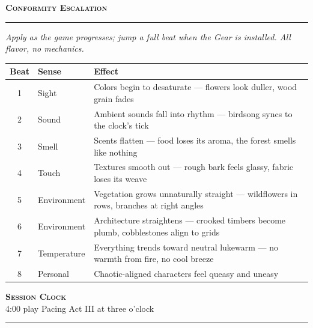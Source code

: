 \documentclass[10pt,letterpaper]{article}
\newcommand{\sceneheader}[4]{%
  \fancyhead[L]{\small\textcolor{accent}{\scshape #1}}%
  \fancyhead[R]{\small\textcolor{accent}{#2 \quad \textbullet \quad #3}}%
  \begin{center}
  {\LARGE\bfseries\scshape\textcolor{accent}{#1}}\\[2pt]
  {\small #2 \quad \textbullet \quad #3 \quad \textbullet \quad #4}\\[2pt]
  \textcolor{rulecol}{\rule{0.5\textwidth}{0.8pt}}
  \end{center}
  \vspace{-4pt}
}
\begin{document}
\vspace{6pt}
{\large\bfseries\scshape Conformity Escalation}\\[-2pt]
\textcolor{rulecol}{\rule{\textwidth}{0.6pt}}
\textit{Apply as the game progresses; jump a full beat when the Gear is installed. All flavor, no mechanics.}\\[2pt]
\renewcommand{\arraystretch}{1.05}
\begin{tabularx}{\textwidth}{@{}clX@{}}
\toprule
\textbf{Beat} & \textbf{Sense} & \textbf{Effect} \\
\midrule
1 & Sight & Colors begin to desaturate --- flowers look duller, wood grain fades \\
2 & Sound & Ambient sounds fall into rhythm --- birdsong syncs to the clock's tick \\
3 & Smell & Scents flatten --- food loses its aroma, the forest smells like nothing \\
4 & Touch & Textures smooth out --- rough bark feels glassy, fabric loses its weave \\
5 & Environment & Vegetation grows unnaturally straight --- wildflowers in rows, branches at right angles \\
6 & Environment & Architecture straightens --- crooked timbers become plumb, cobblestones align to grids \\
7 & Temperature & Everything trends toward neutral lukewarm --- no warmth from fire, no cool breeze \\
8 & Personal & Chaotic-aligned characters feel queasy and uneasy \\
\bottomrule
\end{tabularx}
\renewcommand{\arraystretch}{1.0}

\newpage



\label{sec:clock}\sceneheader{Session Clock}{4:00 play}{Pacing}{Act III at three o'clock}
\end{document}
